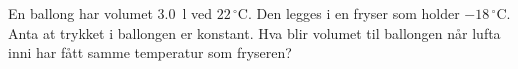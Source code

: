 %
En ballong har volumet \SI{3.0}{\litre} ved $22\,^\circ$C. Den legges i en fryser som holder $-18\,^\circ$C. Anta at trykket i ballongen er konstant. Hva blir volumet til ballongen når lufta inni har fått samme temperatur som fryseren?
%
